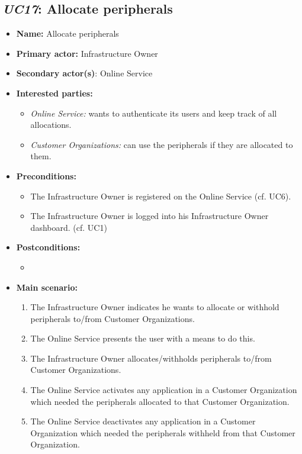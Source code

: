 \documentclass[english,peerreview]{sareport}
\begin{document}
\subsection{\emph{UC17}: Allocate peripherals}
\begin{itemize}
    \item \textbf{Name:} Allocate peripherals
    \item \textbf{Primary actor:} Infrastructure Owner
    \item \textbf{Secondary actor(s)}: Online Service
    \item \textbf{Interested parties:} 
        \begin{itemize}
             \item \textit{Online Service:}  wants to authenticate its users and keep track of all allocations.
             \item \textit{Customer Organizations: } can use the peripherals if they are allocated to them.
        \end{itemize}

    \item \textbf{Preconditions:}
        \begin{itemize}
            \item The Infrastructure Owner is registered on the Online Service (cf. UC6).
            \item The Infrastructure Owner is logged into his Infrastructure Owner dashboard. (cf. UC1)
        \end{itemize}

    \item \textbf{Postconditions:}
        \begin{itemize}
            \item
        \end{itemize}

        
    \item \textbf{Main scenario:} 
    \begin{enumerate}
       \item The Infrastructure Owner indicates he wants to allocate or withhold peripherals to/from Customer Organizations.
       \item The Online Service presents the user with a means to do this.
       \item The Infrastructure Owner allocates/withholds peripherals to/from Customer Organizations.
       \item The Online Service activates any application in a Customer Organization which needed the peripherals allocated to that Customer Organization.
       \item The Online Service deactivates any application in a Customer Organization which needed the peripherals withheld from that Customer Organization.
    \end{enumerate}
\end{itemize}
\end{document}
